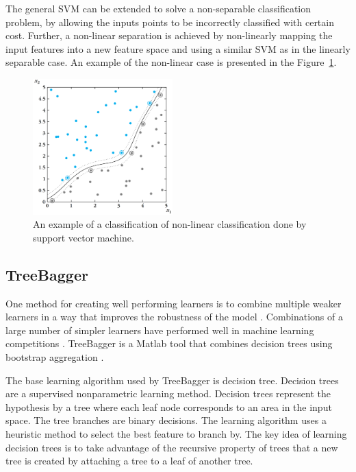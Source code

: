 The general SVM can be extended to solve a non-separable classification problem, by allowing the inputs points to be incorrectly classified with certain cost. Further, a non-linear separation is achieved by non-linearly mapping the input features into a new feature space and using a similar SVM as in the linearly separable case. An example of the non-linear case is presented in the Figure~\ref{fig:support-vector-machine-linear-non-linear}.~\cite{theodoridis:2009:pattern-recognition}

\begin{figure}[H]
\centering
\includegraphics[width=0.48\textwidth]{images/support-vector-machine-non-linear.pdf}
\caption{An example of a classification of non-linear classification done by support vector machine.~\cite{theodoridis:2009:pattern-recognition}}
\label{fig:support-vector-machine-linear-non-linear}
\end{figure}

\subsection{TreeBagger}
One method for creating well performing learners is to combine multiple weaker learners in a way that improves the robustness of the model \cite{alpaydin:2004:introduction}. Combinations of a large number of simpler learners have performed well in machine learning competitions \cite{kaggle:2015:winner}. TreeBagger is a Matlab tool that combines decision trees using bootstrap aggregation \cite{matlab:2015:treebagger}.

The base learning algorithm used by TreeBagger is decision tree. Decision trees are a supervised nonparametric learning method. Decision trees represent the hypothesis by a tree where each leaf node corresponds to an area in the input space. The tree branches are binary decisions. The learning algorithm uses a heuristic method to select the best feature to branch by. The key idea of learning decision trees is to take advantage of the recursive property of trees that a new tree is created by attaching a tree to a leaf of another tree. \cite{alpaydin:2004:introduction}


